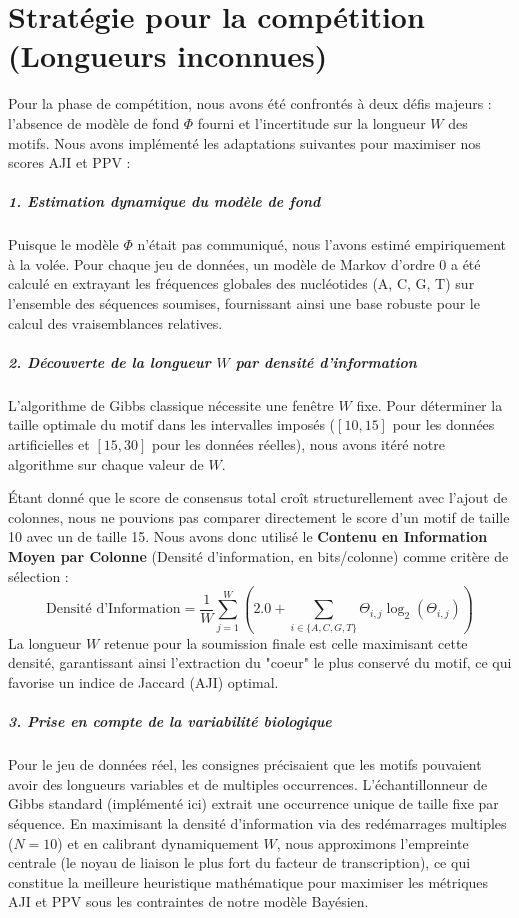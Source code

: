 \section{Stratégie pour la compétition (Longueurs inconnues)}

Pour la phase de compétition, nous avons été confrontés à deux défis majeurs : l'absence de modèle de fond $\Phi$ fourni et l'incertitude sur la longueur $W$ des motifs. Nous avons implémenté les adaptations suivantes pour maximiser nos scores AJI et PPV :

\subparagraph{1. Estimation dynamique du modèle de fond}
Puisque le modèle $\Phi$ n'était pas communiqué, nous l'avons estimé empiriquement à la volée. Pour chaque jeu de données, un modèle de Markov d'ordre 0 a été calculé en extrayant les fréquences globales des nucléotides (A, C, G, T) sur l'ensemble des séquences soumises, fournissant ainsi une base robuste pour le calcul des vraisemblances relatives.

\subparagraph{2. Découverte de la longueur $W$ par densité d'information}
L'algorithme de Gibbs classique nécessite une fenêtre $W$ fixe. Pour déterminer la taille optimale du motif dans les intervalles imposés ($[10, 15]$ pour les données artificielles et $[15, 30]$ pour les données réelles), nous avons itéré notre algorithme sur chaque valeur de $W$.

Étant donné que le score de consensus total croît structurellement avec l'ajout de colonnes, nous ne pouvions pas comparer directement le score d'un motif de taille 10 avec un de taille 15. Nous avons donc utilisé le \textbf{Contenu en Information Moyen par Colonne} (Densité d'information, en bits/colonne) comme critère de sélection :
\begin{equation}
    \text{Densité d'Information} = \frac{1}{W} \sum_{j=1}^{W} \left( 2.0 + \sum_{i \in \{A,C,G,T\}} \Theta_{i,j} \log_2(\Theta_{i,j}) \right)
\end{equation}
La longueur $W$ retenue pour la soumission finale est celle maximisant cette densité, garantissant ainsi l'extraction du "coeur" le plus conservé du motif, ce qui favorise un indice de Jaccard (AJI) optimal.

\subparagraph{3. Prise en compte de la variabilité biologique}
Pour le jeu de données réel, les consignes précisaient que les motifs pouvaient avoir des longueurs variables et de multiples occurrences. L'échantillonneur de Gibbs standard (implémenté ici) extrait une occurrence unique de taille fixe par séquence. En maximisant la densité d'information via des redémarrages multiples ($N=10$) et en calibrant dynamiquement $W$, nous approximons l'empreinte centrale (le noyau de liaison le plus fort du facteur de transcription), ce qui constitue la meilleure heuristique mathématique pour maximiser les métriques AJI et PPV sous les contraintes de notre modèle Bayésien.